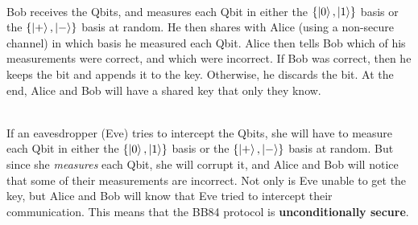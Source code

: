 \documentclass[12pt]{article}
\begin{document}
\noindent
\\
Bob receives the Qbits, and measures each Qbit in either the $\{ \ket{0}, \ket{1} \}$ basis or the $\{ \ket{+}, \ket{-} \}$ basis at random.
He then shares with Alice (using a non-secure channel) in which basis he measured each Qbit.
Alice then tells Bob which of his measurements were correct, and which were incorrect.
If Bob was correct, then he keeps the bit and appends it to the key.
Otherwise, he discards the bit.
At the end, Alice and Bob will have a shared key that only they know.

\noindent
\\
If an eavesdropper (Eve) tries to intercept the Qbits, she will have to measure each Qbit in either the $\{ \ket{0}, \ket{1} \}$ basis or the $\{ \ket{+}, \ket{-} \}$ basis at random.
But since she \textit{measures} each Qbit, she will corrupt it, and Alice and Bob will notice that some of their measurements are incorrect.
Not only is Eve unable to get the key, but Alice and Bob will know that Eve tried to intercept their communication.
This means that the BB84 protocol is \textbf{unconditionally secure}.
\end{document}
